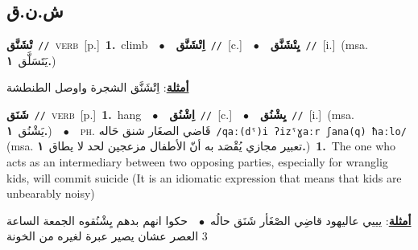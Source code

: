\documentclass[10pt,a4paper,twoside]{article} %
\begin{document}
\begin{multicols}{2}
\vspace{-3mm}
\subsection*{\color{blue}\foreignlanguage{arabic}{ش.ن.ق}\color{blue}{}} 

{\setlength\topsep{0pt}\textbf{\foreignlanguage{arabic}{تْشَنَّق}}\ {\color{gray}\texttt{//}\color{black}}\ \textsc{verb}\ [p.]\ \textbf{1.}~climb\ \ $\bullet$\ \ \setlength\topsep{0pt}\textbf{\foreignlanguage{arabic}{اِتْشَنَّق}}\ {\color{gray}\texttt{//}\color{black}}\ [c.]\ \ $\bullet$\ \ \setlength\topsep{0pt}\textbf{\foreignlanguage{arabic}{يِتْشَنَّق}}\ {\color{gray}\texttt{//}\color{black}}\ [i.]\ \color{gray}(msa. \foreignlanguage{arabic}{يَتَسَلَّق}~\foreignlanguage{arabic}{\textbf{١.}})\color{black}\  \begin{flushright}\color{gray}\foreignlanguage{arabic}{\textbf{\underline{\foreignlanguage{arabic}{أمثلة}}}: اِتْشَنَّق الشجرة واوصل الطنطشة}\end{flushright}\color{black}} \vspace{2mm}

{\setlength\topsep{0pt}\textbf{\foreignlanguage{arabic}{شَنَق}}\ {\color{gray}\texttt{//}\color{black}}\ \textsc{verb}\ [p.]\ \textbf{1.}~hang\ \ $\bullet$\ \ \setlength\topsep{0pt}\textbf{\foreignlanguage{arabic}{اِشْنُق}}\ {\color{gray}\texttt{//}\color{black}}\ [c.]\ \ $\bullet$\ \ \setlength\topsep{0pt}\textbf{\foreignlanguage{arabic}{يِشْنُق}}\ {\color{gray}\texttt{//}\color{black}}\ [i.]\ \color{gray}(msa. \foreignlanguage{arabic}{يَشْنُق}~\foreignlanguage{arabic}{\textbf{١.}})\color{black}\ \ $\bullet$\ \ \textsc{ph.} \color{gray} \foreignlanguage{arabic}{قَاضي الصغَار شنق حَاله}\color{black}\ {\color{gray}\texttt{/{\sffamily qaː(dˤ)i ʔizˤɣaːr ʃana(q) ħaːlo}/}\color{black}}\ \color{gray} (msa. \foreignlanguage{arabic}{تعبير مجازي يُقْصَد به أنّ الأطفال مزعجين لحد لا يطاق}~\foreignlanguage{arabic}{\textbf{١.}})\color{black}\ \textbf{1.}~The one who acts as an intermediary between two opposing parties, especially for wranglig kids, will commit suicide (It is an idiomatic expression that means that kids are unbearably noisy)\  \begin{flushright}\color{gray}\foreignlanguage{arabic}{\textbf{\underline{\foreignlanguage{arabic}{أمثلة}}}: يييي عاليهود قاضِي الصْغَأر شَنَق حالُه\ $\bullet$\ \  حكوا انهم بدهم يِشْنُقوه الجمعة الساعة 3 العصر عشان يصير عبرة لغيره من الخونة}\end{flushright}\color{black}} \vspace{2mm}


\end{multicols}
\end{document}
